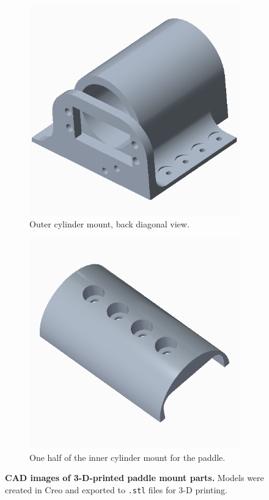 \documentclass[letterpaper, 11pt]{article}
\begin{document}
\begin{enumerate}[label=\textbf{\arabic*.}]
\begin{figure}[ht]
\begin{subfigure}[t]{0.48\textwidth}
        \includegraphics[height=0.25\textheight]{images/outer-mount2.png}
        \caption{Outer cylinder mount, back diagonal view.}
    \end{subfigure}

    \begin{subfigure}[t]{0.48\textwidth}
        \centering
        \includegraphics[height=0.25\textheight]{images/inner-mount.png}
        \caption{One half of the inner cylinder mount for the paddle.}
    \end{subfigure}
    \caption{\textbf{CAD images of 3-D-printed paddle mount parts.} Models were created in Creo and exported to \texttt{.stl} files for 3-D printing.}
    \label{fig:paddle}
\end{figure}


\end{enumerate}
\end{document}
